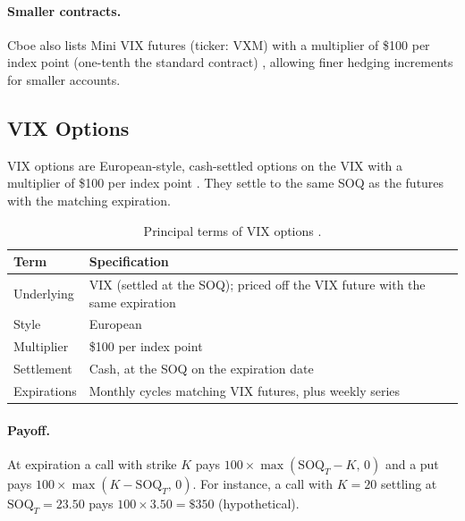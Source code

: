 \paragraph{Smaller contracts.} Cboe also lists Mini VIX futures (ticker: VXM) with a multiplier of \$100 per index point (one-tenth the standard contract) \cite{cboevxfut}, allowing finer hedging increments for smaller accounts.

\subsection{VIX Options}
\label{sec:vix-options}

VIX options are European-style, cash-settled options on the VIX with a multiplier of \$100 per index point \cite{cboevxopt}. They settle to the same SOQ as the futures with the matching expiration.

\begin{table}[htbp]
\centering
\small
\begin{tabular}{@{}p{3.6cm}p{11cm}@{}}
\toprule
\textbf{Term} & \textbf{Specification}\\
\midrule
Underlying & VIX (settled at the SOQ); priced off the VIX future with the same expiration\\
Style & European\\
Multiplier & \$100 per index point\\
Settlement & Cash, at the SOQ on the expiration date\\
Expirations & Monthly cycles matching VIX futures, plus weekly series \cite{cboevxopt}\\
\bottomrule
\end{tabular}
\caption{Principal terms of VIX options \cite{cboevxopt}.}
\label{tab:vix-options}
\end{table}

\paragraph{Payoff.} At expiration a call with strike $K$ pays $100\times\max(\text{SOQ}_T-K,\,0)$ and a put pays $100\times\max(K-\text{SOQ}_T,\,0)$. For instance, a call with $K=20$ settling at $\text{SOQ}_T=23.50$ pays $100\times 3.50 = \$350$ (hypothetical).

